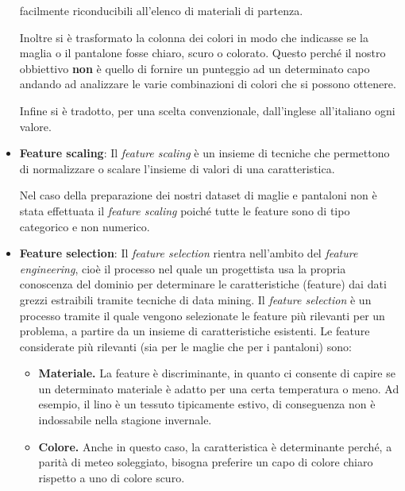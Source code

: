 \documentclass[a4paper, 11pt, oneside]{report}
\begin{document}
\begin{itemize}
                    facilmente riconducibili all'elenco di materiali di partenza.
                    \par \noindent Inoltre si è trasformato la colonna dei colori in modo che indicasse se la maglia o il pantalone
                    fosse chiaro, scuro o colorato.
                    Questo perché il nostro obbiettivo \textbf{non} è quello di fornire un punteggio ad un determinato capo andando ad
                    analizzare le varie combinazioni di colori che si possono ottenere.
                    \par \noindent Infine si è tradotto, per una scelta convenzionale, dall'inglese all'italiano ogni valore.
                    \item \textbf{Feature scaling}: Il \textit{feature scaling} è un insieme di tecniche che permettono di
                    normalizzare o scalare l'insieme di valori di una caratteristica.
                    \par \noindent Nel caso della preparazione dei nostri dataset di maglie e pantaloni non è stata effettuata
                    il  \textit{feature scaling} poiché tutte le feature sono di tipo categorico e non numerico.
                    \item \textbf{Feature selection}: Il \textit{feature selection} rientra nell'ambito del \textit{feature engineering},
                    cioè il processo nel quale un progettista usa la propria conoscenza del dominio per determinare le caratteristiche
                    (feature) dai dati grezzi estraibili tramite tecniche di data mining. Il \textit{feature selection} è un processo tramite
                    il quale vengono selezionate le feature più rilevanti per un problema, a partire da un insieme di caratteristiche esistenti.
                    Le feature considerate più rilevanti (sia per le maglie che per i pantaloni) sono:
                    \begin{itemize}
                        \item \textbf{Materiale.} La feature è discriminante, in quanto ci consente di capire se un determinato materiale è adatto per
                        una certa temperatura o meno. Ad esempio, il lino è un tessuto tipicamente estivo, di conseguenza non è indossabile nella
                        stagione invernale.
                        \item \textbf{Colore.} Anche in questo caso, la caratteristica è determinante perché, a parità di meteo soleggiato, bisogna preferire
                        un capo di colore chiaro rispetto a uno di colore scuro.

\end{itemize}
\end{itemize}
\end{document}
